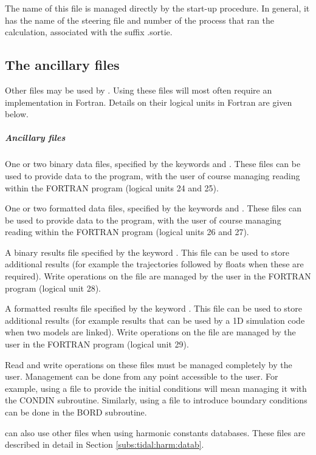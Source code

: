  The name of this file is managed directly by the  start-up procedure. In general, it has the name of the steering file and number of the process that ran the calculation, associated with the suffix .sortie.


\subsection{ The ancillary files}

 Other files may be used by . Using these files will most often require an implementation in Fortran. Details on their logical units in Fortran are given below.


\subparagraph{ Ancillary files}

 One or two binary data files, specified by the keywords  and  . These files can be used to provide data to the program, with the user of course managing reading within the FORTRAN program (logical units 24 and 25).

 One or two formatted data files, specified by the keywords  and .  These files can be used to provide data to the program, with the user of course managing reading within the FORTRAN program (logical units 26 and 27).

 A binary results file specified by the keyword . This file can be used to store additional results (for example the trajectories followed by floats when these are required). Write operations on the file are managed by the user in the FORTRAN program (logical unit 28).

 A formatted results file specified by the keyword . This file can be used to store additional results (for example results that can be used by a 1D simulation code when two models are linked). Write operations on the file are managed by the user in the FORTRAN program (logical unit 29).

 Read and write operations on these files must be managed completely by the user. Management can be done from any point accessible to the user. For example, using a file to provide the initial conditions will mean managing it with the CONDIN subroutine. Similarly, using a file to introduce boundary conditions can be done in the BORD subroutine.

  can also use other files when using harmonic constants databases. These files are described in detail in Section \ref{subs:tidal:harm:datab}.


